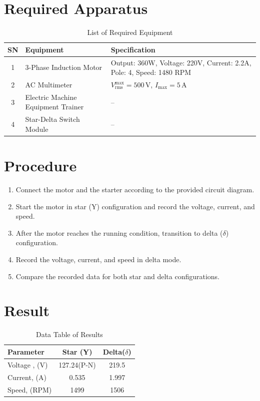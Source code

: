 \documentclass[a4paper,12pt]{article}
\begin{document}
	
	\section{Required Apparatus}
	\begin{table}[H]
		\centering
		\caption{ List of Required Equipment}
		\begin{tabular}{|c|p{5.5cm}|p{6cm}|}
			\hline
			\textbf{SN} & \textbf{Equipment} & \textbf{Specification} \\
			\hline
			1 & 3-Phase Induction Motor & Output: 360W, Voltage: 220V, Current: 2.2A, Pole: 4, Speed: 1480 RPM \\
			\hline
			2 & AC Multimeter & $V_{\text{rms}}^{\text{max}} = 500\,\text{V}$, $I_{\text{max}} = 5\,\text{A}$ \\
			\hline
			3 & Electric Machine Equipment Trainer & – \\
			\hline
			4 & Star-Delta Switch Module & – \\
			\hline
		\end{tabular}
	\end{table}
	
	\section{Procedure}
	
	\begin{enumerate}
		\item Connect the motor and the starter according to the provided circuit diagram.
		\item Start the motor in star (Y) configuration and record the voltage, current, and speed.
		\item After the motor reaches the running condition, transition to delta ($\delta$) configuration.
		\item Record the voltage, current, and speed in delta mode.
		\item Compare the recorded data for both star and delta configurations.
	\end{enumerate}
	
	
	
	\section{Result}
	
	\begin{table}[H]
		\centering
			\caption{Data Table of Results}
		\begin{tabular}{|l|c|c|}
			\hline
			\textbf{Parameter} & \textbf{Star (Y)} & \textbf{Delta($\delta$)} \\
			\hline
			Voltage , (V) & 127.24(P-N) & 219.5 \\
			\hline
			Current,  (A) & 0.535 & 1.997  \\
			\hline
			Speed, (RPM) & 1499 & 1506 \\
			\hline
		\end{tabular}
	
	\end{table}
	
\end{document}
